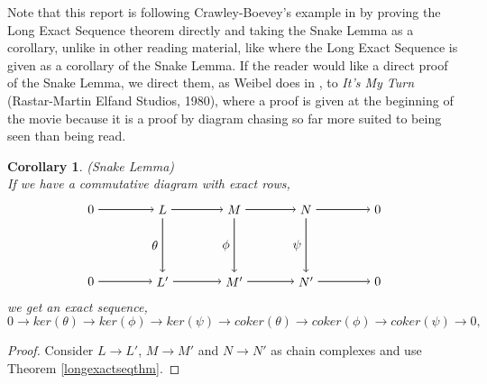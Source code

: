 \documentclass[11.5pt, twoside, a4paper, titlepage]{report}
\theoremstyle{definition}
\theoremstyle{plain}
\newtheorem{cor}[mydef]{Corollary}
\begin{document}
Note that this report is following Crawley-Boevey's example in \cite{CB1} by proving the Long Exact Sequence theorem directly and taking the Snake Lemma as a corollary, unlike in other reading material, like \cite{Weibel} where the Long Exact Sequence is given as a corollary of the Snake Lemma. If the reader would like a direct proof of the Snake Lemma, we direct them, as Weibel does in \cite{Weibel}, to \emph{It's My Turn} (Rastar-Martin Elfand Studios, 1980), where a proof is given at the beginning of the movie because it is a proof by diagram chasing so far more suited to being seen than being read.

\begin{cor} (Snake Lemma)\\
If we have a commutative diagram with exact rows, 
\begin{equation*}
\begin{tikzpicture}[->,-latex, auto, main path/.style={->, semithick}, main node/.style={}]

\node	[main node]		(2) at (2,0)		{$0$};
\node	[main node]		(3) at (4,0)		{$L$};
\node [main node]		(4) at (6,0)		{$M$};
\node [main node]		(5) at (8,0)		{$N$};
\node	[main node]		(11) at (10,0)	{$0$};


\node	[main node]		(7) at (2,-2)		{$0$};
\node	[main node]		(8) at (4,-2)		{$L'$};
\node [main node]		(9) at (6,-2)		{$M'$};
\node [main node]		(10) at (8,-2)	{$N'$};
\node [main node]		(13) at (10,-2)	{$0$};

\draw (2) edge [main path] node [auto] {$$} (3);
\draw (3) edge [main path]node [auto] {$$} (4);
\draw (4) edge [main path] node [auto] {$$} (5);
\draw (5) edge [main path] (11);

\draw (7) edge [main path] node [auto] {$$} (8);
\draw (8) edge [main path] (9);
\draw (9) edge [main path] (10);
\draw (10) edge [main path] (13);


\draw (3) edge [main path] node [auto, swap] {$\theta$} (8);
\draw (4) edge [main path] node [auto, swap] {$\phi$} (9);
\draw (5) edge [main path] node [auto, swap] {$\psi$} (10);

\end{tikzpicture}
\end{equation*}
we get an exact sequence, 
\begin{equation*}
0\xrightarrow{}ker(\theta)\xrightarrow{}ker(\phi)\xrightarrow{}ker(\psi)\xrightarrow{}coker(\theta)\xrightarrow{}coker(\phi)\xrightarrow{}coker(\psi)\xrightarrow{}0,
\end{equation*}
\end{cor}
\begin{proof}
Consider $L\to L'$, $M\to M'$ and $N\to N'$ as chain complexes and use Theorem \ref{longexactseqthm}.
\end{proof}
\end{document}
